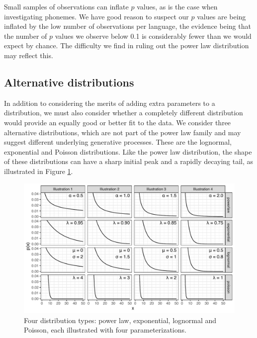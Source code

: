 Small samples of observations can inflate \(p\) values, as is the case when investigating phonemes. We have good reason to suspect our \(p\) values are being inflated by the low number of observations per language, the evidence being that the number of \(p\) values we observe below 0.1 is considerably fewer than we would expect by chance. The difficulty we find in ruling out the power law distribution may reflect this.

\hypertarget{alternative-distributions}{%
\subsection{Alternative distributions}\label{alternative-distributions}}

In addition to considering the merits of adding extra parameters to a distribution, we must also consider whether a completely different distribution would provide an equally good or better fit to the data. We consider three alternative distributions, which are not part of the power law family and may suggest different underlying generative processes. These are the lognormal, exponential and Poisson distributions. Like the power law distribution, the shape of these distributions can have a sharp initial peak and a rapidly decaying tail, as illustrated in Figure \ref{fig:Figure-3}.

\begin{figure}

{\centering \includegraphics[width=180mm]{03-phoneme-frequencies/fig/Fig3_distribution_illustrations} 

}

\caption[Illustrations of power law, exponential, lognormal and Poisson distributions]{Four distribution types: power law, exponential, lognormal and Poisson, each illustrated with four parameterizations.}\label{fig:Figure-3}
\end{figure}

